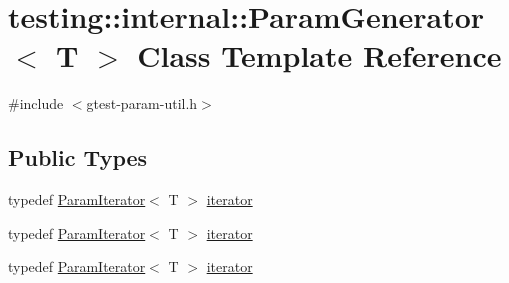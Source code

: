 \hypertarget{classtesting_1_1internal_1_1_param_generator}{}\section{testing\+::internal\+::Param\+Generator$<$ T $>$ Class Template Reference}
\label{classtesting_1_1internal_1_1_param_generator}


{\ttfamily \#include $<$gtest-\/param-\/util.\+h$>$}

\subsection*{Public Types}
\begin{DoxyCompactItemize}
\item 
typedef \mbox{\hyperlink{classtesting_1_1internal_1_1_param_iterator}{Param\+Iterator}}$<$ T $>$ \mbox{\hyperlink{classtesting_1_1internal_1_1_param_generator_a448b08a8eaae1f1d27840d4dbd66c357}{iterator}}
\item 
typedef \mbox{\hyperlink{classtesting_1_1internal_1_1_param_iterator}{Param\+Iterator}}$<$ T $>$ \mbox{\hyperlink{classtesting_1_1internal_1_1_param_generator_a448b08a8eaae1f1d27840d4dbd66c357}{iterator}}
\item 
typedef \mbox{\hyperlink{classtesting_1_1internal_1_1_param_iterator}{Param\+Iterator}}$<$ T $>$ \mbox{\hyperlink{classtesting_1_1internal_1_1_param_generator_a448b08a8eaae1f1d27840d4dbd66c357}{iterator}}
\end{DoxyCompactItemize}
